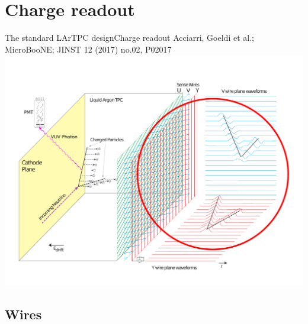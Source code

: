 \documentclass[]{beamer}
\newcommand*{\uboone}{{MicroBooNE}}
\newcommand*{\lartpc}{{LArTPC}}
\begin{document}
\section{Charge readout}

\begin{frame}{The standard \lartpc{} design}{Charge readout}
	{\tiny Acciarri, Goeldi et al.; \uboone{}; JINST 12 (2017) no.02, P02017~\cite{uboone}}\\
	\centering
	\includegraphics[viewport=35 40 755 540, clip, height=.75\textheight]{defence/TPCprinciple_charge-ro}\\
\end{frame}

\subsection{Wires}
\end{document}
